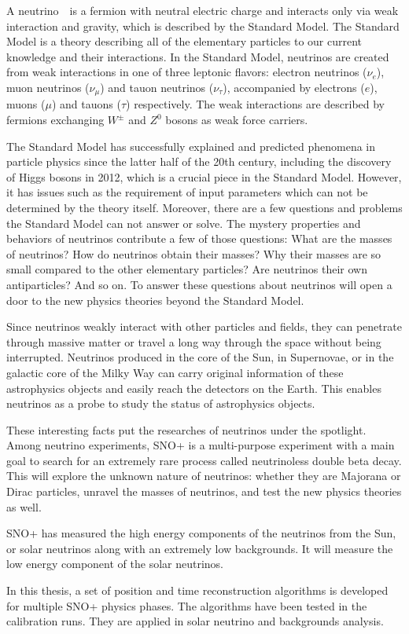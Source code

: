  
A neutrino　is a fermion with neutral electric charge and interacts only via weak interaction and gravity, which is described by the Standard Model. The Standard Model is a theory describing all of the elementary particles to our current knowledge and their interactions.
In the Standard Model, neutrinos are created from weak interactions in one of three leptonic flavors:
electron neutrinos ($\nu_e$), muon neutrinos ($\nu_\mu$) and tauon neutrinos ($\nu_\tau$), accompanied by electrons ($e$), muons ($\mu$) and tauons ($\tau$) respectively. The weak interactions are described by fermions exchanging $W^{\pm}$ and $Z^0$ bosons as weak force carriers.

The Standard Model has successfully explained and predicted phenomena in particle physics since the latter half of the 20th century, including the discovery of Higgs bosons in 2012, which is a crucial piece in the Standard Model. However, it has issues such as the requirement of input parameters which can not be determined by the theory itself. Moreover, there are a few questions and problems the Standard Model can not answer or solve. The mystery properties and behaviors of neutrinos contribute a few of those questions: What are the masses of neutrinos? How do neutrinos obtain their masses? Why their masses are so small compared to the other elementary particles? Are neutrinos their own antiparticles? And so on. To answer these questions about neutrinos will open a door to the new physics theories beyond the Standard Model.

Since neutrinos weakly interact with other particles and fields, they can penetrate through massive matter or travel a long way through the space without being interrupted. Neutrinos produced in the core of the Sun, in Supernovae, or in the galactic core of the Milky Way can carry original information of these astrophysics objects and easily reach the detectors on the Earth. This enables neutrinos as a probe to study the status of astrophysics objects.

These interesting facts put the researches of neutrinos under the spotlight. Among neutrino experiments, SNO+ is a multi-purpose experiment with a main goal to search for an extremely rare process called neutrinoless double beta decay. This will explore the unknown nature of neutrinos: whether they are Majorana or Dirac
particles, unravel the masses of neutrinos, and test the new physics theories as well.

SNO+ has measured the high energy components of the neutrinos from the Sun, or solar neutrinos along with an extremely low backgrounds. It will measure the low energy component of the solar neutrinos.

In this thesis, a set of position and time reconstruction algorithms is developed for multiple SNO+ physics phases. The algorithms have been tested in the calibration runs. They are applied in solar neutrino and backgrounds analysis.
